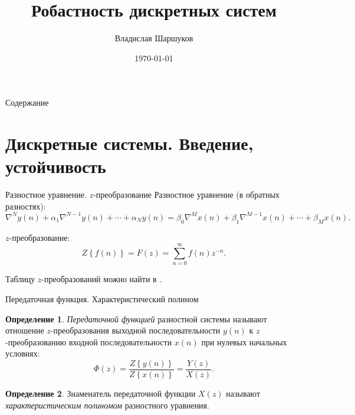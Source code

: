 \documentclass[notheorems,aspectratio=169]{beamer}
\author{Владислав Шаршуков}
\date{\today}
\title{Робастность дискретных систем}
\theoremstyle{definition}
\newtheorem{definition}{Определение}
\begin{document}
\begin{frame}
  \titlepage
\end{frame}

\begin{frame}{Содержание}
  \tableofcontents
\end{frame}

\section{Дискретные системы. Введение, устойчивость}

\begin{frame}{Разностное уравнение. $z$-преобразование}
  Разностное уравнение (в обратных разностях):
  \begin{equation*}
    \nabla^N y(n) + \alpha_1 \nabla^{N-1} y(n) + \cdots + \alpha_N y(n) = 
    \beta_0 \nabla^M x(n) + \beta_1 \nabla^{M-1} x(n) + \cdots + \beta_M x(n).
  \end{equation*}

  $z$-преобразование:
  \begin{equation*}
    Z\left\{ f(n) \right\} = F(z) = \sum_{n=0}^\infty f(n) z^{-n}.
  \end{equation*}

  Таблицу $z$-преобразований можно найти в \cite[с.~255]{Kargu1974}.
\end{frame}

\begin{frame}{Передаточная функция. Характеристический полином}
  \begin{definition}
    \textit{Передаточной функцией} разностной системы называют отношение
    $z$-преобразования выходной последовательности $y(n)$ к $z$-преобразованию
    входной последовательности $x(n)$ при нулевых начальных условиях:
    \begin{equation*}
      \Phi(z) = \frac{Z\left\{ y(n) \right\}}{Z\left\{ x(n)\right\}} = \frac{Y(z)}{X(z)}.
    \end{equation*}
  \end{definition}

  \begin{definition}
    Знаменатель передаточной функции $X(z)$ называют \textit{характеристическим полиномом} разностного уравнения.
  \end{definition}
\end{frame}
\end{document}
